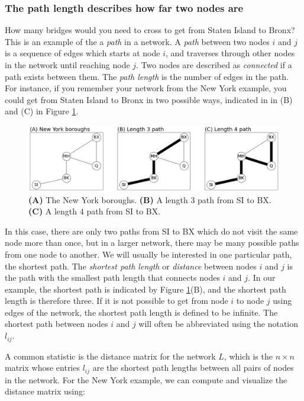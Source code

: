 \subsubsection{The path length describes how far two nodes are}
\label{sec:ch4:prop-net:path}
How many bridges would you need to cross to get from Staten Island to Bronx? This is an example of the a \emph{path} in a network. A \textit{path} between two nodes $i$ and $j$ is a sequence of edges which starts at node $i$, and traverses through other nodes in the network until reaching node $j$. Two nodes are described as \textit{connected} if a path exists between them. The \textit{path length} is the number of edges in the path. For instance, if you remember your network from the New York example, you could get from Staten Island to Bronx in two possible ways, indicated in in (B) and (C) in Figure \ref{fig:ch4:path}.

\begin{figure}[h]
    \centering
    \includegraphics[width=\linewidth]{representations/ch4/Images/path.png}
    \caption[Path length in New York boroughs]{\textbf{(A)} The New York boroughs. \textbf{(B)} A length $3$ path from SI to BX. \textbf{(C)} A length $4$ path from SI to BX.}
    \label{fig:ch4:path}
\end{figure}
In this case, there are only two paths from SI to BX which do not visit the same node more than once, but in a larger network, there may be {many} possible paths from one node to another. We will usually be interested in one particular path, the {shortest path}. The \textit{shortest path length} or \textit{distance} between nodes $i$ and $j$ is the path with the smallest path length that connects nodes $i$ and $j$. In our example, the shortest path is indicated by Figure \ref{fig:ch4:path}(B), and the shortest path length is therefore three.  If it is not possible to get from node $i$ to node $j$ using edges of the network, the shortest path length is defined to be infinite. The shortest path between nodes $i$ and $j$ will often be abbreviated using the notation $l_{ij}$.

A common statistic is the {distance matrix} for the network $L$, which is the $n \times n$ matrix whose entries $l_{ij}$ are the shortest path lengths between all pairs of nodes in the network. For the New York example, we can compute and visualize the distance matrix using:


